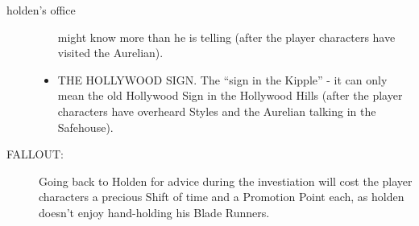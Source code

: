 \documentclass{book}
\begin{document}
\begin{locationbox}{holden's office}
\begin{multicols}{2}
\begin{description}
\begin{itemize}
						might know more than he is
						telling (after the player
							characters have visited
						the Aurelian).
					\item[\color{titlered}{$\blackinwhitesquare$}]
						{\color{titlered} THE
						HOLLYWOOD SIGN. }
						The ``sign in the Kipple'' - it
						can only mean the old Hollywood
						Sign in the Hollywood Hills
						(after the player characters
							have overheard Styles
							and the Aurelian talking
						in the Safehouse).
				\end{itemize}
			\item[\textsf{\color{titlered}FALLOUT:}]
				Going back to Holden for advice during the
				investiation will cost the player characters a
				precious Shift of time and a Promotion Point
				each, as holden doesn't enjoy hand-holding his
				Blade Runners.
		\end{description}
	\end{multicols}
	\end{locationbox}
\end{document}
